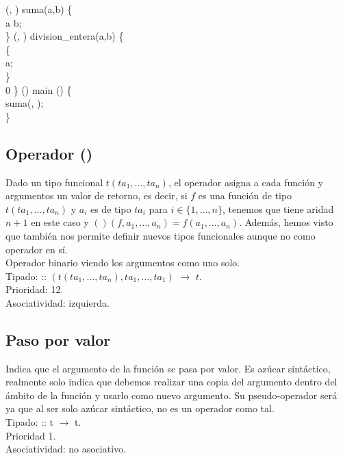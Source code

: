 \begin{algorithm}
	(, ) 
	suma(a,b) \{ \\
	\quad {} a \operator{+} b;  \\
	\} \;
	(, ) 
	division\_entera(a,b) \{ \\
	\quad {} \{\\
	\quad \quad \Returnn{} a;\\
	\quad \}\\
	\quad \Returnn{} 0 \;
	\}\;
	\Void () main () \{\\
	\quad suma(, );	 \\
	\}\;
	
	
\end{algorithm}

\subsection*{Operador ()}
Dado un tipo funcional $t(ta_{1},\dots,ta_{n})$, el operador \operator{()} asigna a cada función y argumentos un valor de retorno, es decir, si $f$ es una función de tipo $t(ta_{1},\dots,ta_{n})$ y $a_{i}$ es de tipo $ta_{i}$ para 
$i \in \{1,\dots,n\}$, tenemos que \operator{()} tiene aridad $n+1$ en este caso y 
$()(f,a_{1},\dots,a_{n}) = f(a_{1},\dots,a_{n})$.
Además, hemos visto que también nos permite definir nuevos tipos funcionales aunque no como operador en sí.
\\Operador  binario viendo los argumentos como uno solo.
\\Tipado: \operator{()} :: 
$(t(ta_{1},\dots,ta_{n}), ta_{1}, \dots, ta_{1})$
$\rightarrow$ $t$. 
\\Prioridad: 12.
\\Asociatividad: izquierda.

\subsection*{Paso por valor}
Indica que el argumento de la función se pasa por valor. Es azúcar sintáctico, realmente solo indica que debemos realizar una copia del argumento dentro del ámbito de la función y usarlo como nuevo argumento.
Su pseudo-operador será \Val \, ya que al ser solo azúcar sintáctico, no es un operador como tal.
\\Tipado: \Val :: t $\rightarrow$ t. 
\\Prioridad 1.
\\Asociatividad: no asociativo.


